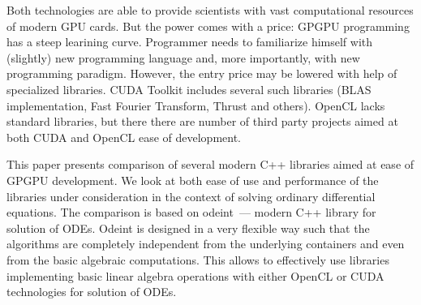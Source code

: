 \documentclass[1p]{elsarticle}
\begin{document}
Both technologies are able to provide scientists with vast computational
resources of modern GPU cards. But the power comes with a price: GPGPU
programming has a steep learining curve. Programmer needs to familiarize
himself with (slightly) new programming language and, more importantly, with
new programming paradigm. However, the entry price may be lowered with help of
specialized libraries. CUDA Toolkit includes several such libraries (BLAS
implementation, Fast Fourier Transform, Thrust and others). OpenCL lacks
standard libraries, but there there are number of third party projects aimed at
both CUDA and OpenCL ease of development.

This paper presents comparison of several modern C++ libraries aimed at ease of
GPGPU development. We look at both ease of use and performance of the libraries
under consideration in the context of solving ordinary differential equations.
The comparison is based on odeint~--- modern C++ library for solution of ODEs.
Odeint is designed in a very flexible way such that the algorithms are
completely independent from the underlying containers and even from the basic
algebraic computations. This allows to effectively use libraries implementing
basic linear algebra operations with either OpenCL or CUDA technologies for
solution of ODEs.
\end{document}

